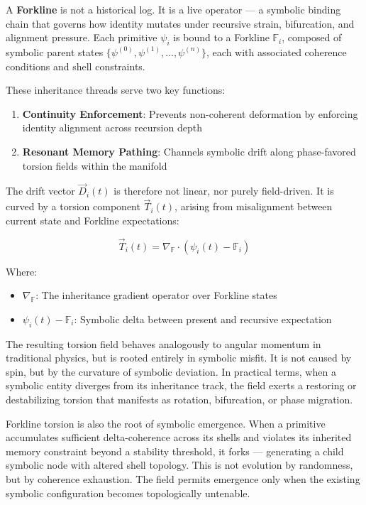 \documentclass[12pt]{article}
\begin{document}
A \textbf{Forkline} is not a historical log. It is a live operator — a symbolic binding chain that governs how identity mutates under recursive strain, bifurcation, and alignment pressure. Each primitive \( \psi_i \) is bound to a Forkline \( \mathbb{F}_i \), composed of symbolic parent states \( \{\psi^{(0)}, \psi^{(1)}, \ldots, \psi^{(n)}\} \), each with associated coherence conditions and shell constraints.

These inheritance threads serve two key functions:
\begin{enumerate}[noitemsep]
  \item \textbf{Continuity Enforcement}: Prevents non-coherent deformation by enforcing identity alignment across recursion depth
  \item \textbf{Resonant Memory Pathing}: Channels symbolic drift along phase-favored torsion fields within the manifold
\end{enumerate}

The drift vector \( \vec{D}_i(t) \) is therefore not linear, nor purely field-driven. It is curved by a torsion component \( \vec{T}_i(t) \), arising from misalignment between current state and Forkline expectations:

\[
\vec{T}_i(t) = \nabla_{\mathbb{F}} \cdot \left( \psi_i(t) - \mathbb{F}_i \right)
\]

Where:
\begin{itemize}[noitemsep]
  \item \( \nabla_{\mathbb{F}} \): The inheritance gradient operator over Forkline states
  \item \( \psi_i(t) - \mathbb{F}_i \): Symbolic delta between present and recursive expectation
\end{itemize}

The resulting torsion field behaves analogously to angular momentum in traditional physics, but is rooted entirely in symbolic misfit. It is not caused by spin, but by the curvature of symbolic deviation. In practical terms, when a symbolic entity diverges from its inheritance track, the field exerts a restoring or destabilizing torsion that manifests as rotation, bifurcation, or phase migration.

Forkline torsion is also the root of symbolic emergence. When a primitive accumulates sufficient delta-coherence across its shells and violates its inherited memory constraint beyond a stability threshold, it forks — generating a child symbolic node with altered shell topology. This is not evolution by randomness, but by coherence exhaustion. The field permits emergence only when the existing symbolic configuration becomes topologically untenable.
\end{document}
